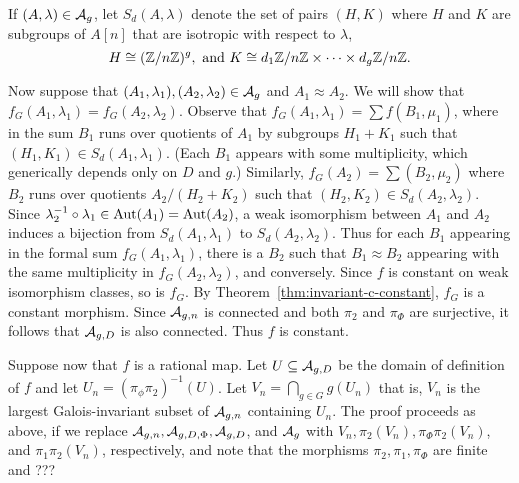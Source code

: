 \documentclass{amsart}
\begin{document}
If $(A,\lambda) \in \mathcal{A}_g$, let $S_d(A,\lambda)$ denote the set of pairs $(H,K)$ where $H$ and $K$ are  subgroups of $A[n]$ that are isotropic with respect to $\lambda$, 
  \[
    H \cong (\mathbb{Z}/n\mathbb{Z})^g, \text{ and } K \cong d_1\mathbb{Z}/n\mathbb{Z} \times \cdots \times d_g\mathbb{Z}/n\mathbb{Z}.
  \]
  
    Now suppose that $(A_1,\lambda_1), (A_2,\lambda_2) \in \mathcal{A}_g$ and $A_1 \approx A_2$. We will show that $f_G(A_1,\lambda_1) = f_G(A_2,\lambda_2)$. Observe that $f_G(A_1,\lambda_1) = \sum f(B_1,\mu_1)$, where in the sum $B_1$ runs over quotients of $A_1$ by subgroups $H_1 + K_1$ such that $(H_1,K_1) \in S_d(A_1,\lambda_1)$. (Each $B_1$ appears with some multiplicity, which generically depends only on $D$ and $g$.) Similarly, $f_G(A_2) = \sum (B_2, \mu_2)$ where $B_2$ runs over quotients $A_2/(H_2 + K_2)$ such that $(H_2,K_2) \in S_d(A_2,\lambda_2)$. Since $\lambda_2^{-1} \circ \lambda_1 \in \operatorname{Aut}(A_1) = \operatorname{Aut}(A_2)$,  a weak isomorphism between $A_1$ and $A_2$ induces a bijection
from $S_d(A_1,\lambda_1)$ to $S_d(A_2,\lambda_2)$.
  Thus for each $B_1$ appearing in the formal sum $f_G(A_1,\lambda_1)$, there is a $B_2$ such that $B_1 \approx B_2$ appearing with the same multiplicity in $f_G(A_2,\lambda_2)$, and conversely. Since $f$ is constant on weak isomorphism classes, so is $f_G$. By Theorem~\ref{thm:invariant-c-constant}, $f_G$ is a constant morphism. Since $\mathcal{A}_{g,n}$ is connected and both $\pi_2$ and $\pi_\Phi$ are surjective, it follows that $\mathcal{A}_{g,{D}}$ is also connected. Thus $f$ is constant.

  Suppose now that $f$ is a rational map. Let $U \subseteq \mathcal{A}_{g,{D}}$ be the domain of definition of $f$ and let $U_n = (\pi_\phi\pi_2)^{-1}(U)$. Let $V_n = \displaystyle\bigcap_{g \in G} g(U_n)$ that is, $V_n$ is the largest Galois-invariant subset of $\mathcal{A}_{g,n}$ containing $U_n$. 
  The proof proceeds as above, if we replace $\mathcal{A}_{g,n}, \mathcal{A}_{g,{D},\Phi}, \mathcal{A}_{g,{D}}$, and $\mathcal{A}_g$ with $V_n, \pi_2(V_n), \pi_\Phi\pi_2(V_n)$,  and $\pi_1\pi_2(V_n)$, respectively, and note that the morphisms $\pi_2, \pi_1, \pi_\Phi$ are finite and ???
\end{document}
